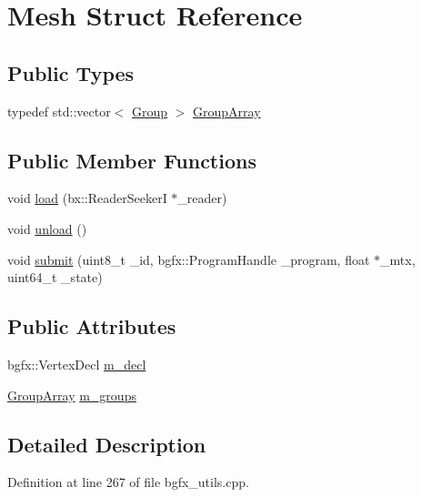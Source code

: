\hypertarget{struct_mesh}{\section{Mesh Struct Reference}
\label{struct_mesh}
}
\subsection*{Public Types}
\begin{DoxyCompactItemize}
\item 
typedef std\+::vector$<$ \hyperlink{struct_group}{Group} $>$ \hyperlink{struct_mesh_aac2eabb5152e121bbb4b1652afe568a0}{Group\+Array}
\end{DoxyCompactItemize}
\subsection*{Public Member Functions}
\begin{DoxyCompactItemize}
\item 
void \hyperlink{struct_mesh_a59a2c14a5dfd063dd579261b4ea2359a}{load} (bx\+::\+Reader\+Seeker\+I $\ast$\+\_\+reader)
\item 
void \hyperlink{struct_mesh_ad85261cc7c136eb6feb3078de1462c18}{unload} ()
\item 
void \hyperlink{struct_mesh_a565eb4332bbc51daf34ef88651caf593}{submit} (uint8\+\_\+t \+\_\+id, bgfx\+::\+Program\+Handle \+\_\+program, float $\ast$\+\_\+mtx, uint64\+\_\+t \+\_\+state)
\end{DoxyCompactItemize}
\subsection*{Public Attributes}
\begin{DoxyCompactItemize}
\item 
bgfx\+::\+Vertex\+Decl \hyperlink{struct_mesh_ad8168b5956620ef2e61a6cc4889d8b55}{m\+\_\+decl}
\item 
\hyperlink{struct_mesh_aac2eabb5152e121bbb4b1652afe568a0}{Group\+Array} \hyperlink{struct_mesh_abcfb049a965b104931860b2fd844dfcf}{m\+\_\+groups}
\end{DoxyCompactItemize}


\subsection{Detailed Description}


Definition at line 267 of file bgfx\+\_\+utils.\+cpp.



